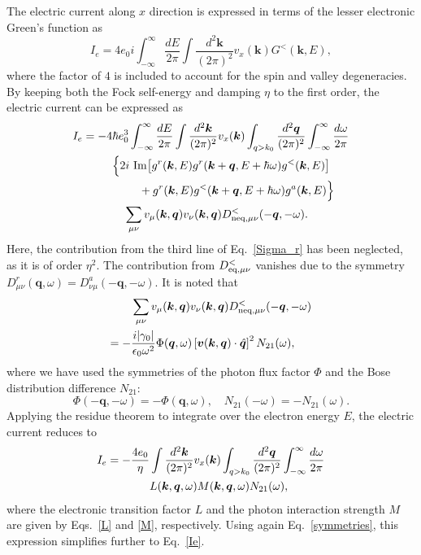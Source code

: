 \documentclass[aps,prl,twocolumn,longbibliography]{revtex4-2}
\begin{document}
The electric current along $x$ direction is expressed in terms of the lesser electronic
Green's function as
\begin{equation}
  I_e = 4 e_0 i \int_{-\infty}^{\infty} \frac{dE}{2\pi}
  \int \frac{d^2\bm{k}}{(2\pi)^2} v_x({\bm{k}}) G^<(\bm{k}, E) ,
\end{equation}
where the factor of $4$ is included to account for the spin and valley degeneracies.
By keeping both the Fock self-energy and damping $\eta$ to the first order, the electric
current can be expressed as
\begin{align}
  I_e = -4 & \hbar e_0^3
   \int_{-\infty}^{\infty} \frac{dE}{2\pi} \int \frac{d^2\bm{k}}{(2\pi)^2}v_x({\bm{k}})
  \int_{q>k_0} \frac{d^2\bm{q}}{(2\pi)^2} \int_{-\infty}^\infty \frac{d\omega}{2\pi}
  \notag \\
   & \Big\{ 2i\ {\rm Im}\big[
   g^r(\bm{k}, E) g^r(\bm{k}+\bm{q},E+\hbar\omega) g^<(\bm{k}, E) \big]  \notag \\
  &\qquad \
  + g^r(\bm{k}, E) g^<(\bm{k}+\bm{q},E+\hbar\omega) g^a(\bm{k}, E) \Big\} \notag \\
  &\quad \sum_{\mu\nu} v_\mu(\bm{k},\bm{q}) v_\nu(\bm{k},\bm{q})
   D_{{\rm neq}, \mu\nu}^<(-\bm{q},-\omega)  .
\end{align}
Here, the contribution from the third line of Eq.~\eqref{Sigma_r} has been neglected, as
it is of order $\eta^2$.
The contribution from $D_{{\rm eq}, \mu\nu}^<$ vanishes due to the symmetry
$D_{\mu\nu}^r(\bm{q}, \omega) = D_{\nu\mu}^a(-\bm{q}, -\omega)$.
It is noted that
\begin{align}
  & \sum_{\mu\nu} v_\mu(\bm{k},\bm{q}) v_\nu(\bm{k},\bm{q})
  D_{{\rm neq}, \mu\nu}^<(-\bm{q},-\omega) \notag \\
  =-& \frac{i |\gamma_0|}{\epsilon_0 \omega^2} \Phi(\bm{q}, \omega)
  \left[ \bm{v}(\bm{k},\bm{q}) \cdot \hat{\bm{q}} \right]^2 N_{21}(\omega) ,
\end{align}
where we have used the symmetries of the photon flux factor $\Phi$ and the Bose distribution difference $N_{21}$:
\begin{equation}\label{symmetries}
  \Phi(-\bm{q},-\omega) = -\Phi(\bm{q},\omega), \quad N_{21}(-\omega) = - N_{21}(\omega).
\end{equation}
Applying the residue theorem to integrate over the electron energy $E$, the electric
current reduces to
\begin{align}
  I_e = -\frac{4 e_0}{\eta} & \int \frac{d^2\bm{k}}{(2\pi)^2} v_x({\bm{k}})
  \int_{q>k_0} \frac{d^2\bm{q}}{(2\pi)^2} \int_{-\infty}^\infty \frac{d\omega}{2\pi}
  \notag \\
  & L(\bm{k},\bm{q}, \omega) M(\bm{k},\bm{q}, \omega) N_{21}(\omega) ,
\end{align}
where the electronic transition factor $L$  and the photon interaction strength $M$ are given by
Eqs.~\eqref{L} and \eqref{M}, respectively. Using again Eq.~\eqref{symmetries},
this expression simplifies further to Eq.~\eqref{Ie}.
\end{document}
